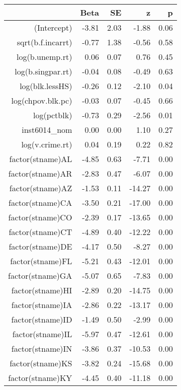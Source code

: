 \begin{table}[ht]
\centering
\begin{tabular}{rrrrr}
  \hline
 & Beta & SE & z & p \\ 
  \hline
(Intercept) & -3.81 & 2.03 & -1.88 & 0.06 \\ 
  sqrt(b.f.incarrt) & -0.77 & 1.38 & -0.56 & 0.58 \\ 
  log(b.unemp.rt) & 0.06 & 0.07 & 0.76 & 0.45 \\ 
  log(b.singpar.rt) & -0.04 & 0.08 & -0.49 & 0.63 \\ 
  log(blk.lessHS) & -0.26 & 0.12 & -2.10 & 0.04 \\ 
  log(chpov.blk.pc) & -0.03 & 0.07 & -0.45 & 0.66 \\ 
  log(pctblk) & -0.73 & 0.29 & -2.56 & 0.01 \\ 
  inst6014\_nom & 0.00 & 0.00 & 1.10 & 0.27 \\ 
  log(v.crime.rt) & 0.04 & 0.19 & 0.22 & 0.82 \\ 
  factor(stname)AL & -4.85 & 0.63 & -7.71 & 0.00 \\ 
  factor(stname)AR & -2.83 & 0.47 & -6.07 & 0.00 \\ 
  factor(stname)AZ & -1.53 & 0.11 & -14.27 & 0.00 \\ 
  factor(stname)CA & -3.50 & 0.21 & -17.00 & 0.00 \\ 
  factor(stname)CO & -2.39 & 0.17 & -13.65 & 0.00 \\ 
  factor(stname)CT & -4.89 & 0.40 & -12.22 & 0.00 \\ 
  factor(stname)DE & -4.17 & 0.50 & -8.27 & 0.00 \\ 
  factor(stname)FL & -5.21 & 0.43 & -12.01 & 0.00 \\ 
  factor(stname)GA & -5.07 & 0.65 & -7.83 & 0.00 \\ 
  factor(stname)HI & -2.89 & 0.20 & -14.75 & 0.00 \\ 
  factor(stname)IA & -2.86 & 0.22 & -13.17 & 0.00 \\ 
  factor(stname)ID & -1.49 & 0.50 & -2.99 & 0.00 \\ 
  factor(stname)IL & -5.97 & 0.47 & -12.61 & 0.00 \\ 
  factor(stname)IN & -3.86 & 0.37 & -10.53 & 0.00 \\ 
  factor(stname)KS & -3.82 & 0.24 & -15.68 & 0.00 \\ 
  factor(stname)KY & -4.45 & 0.40 & -11.18 & 0.00 \\ 

\end{tabular}
\end{table}

